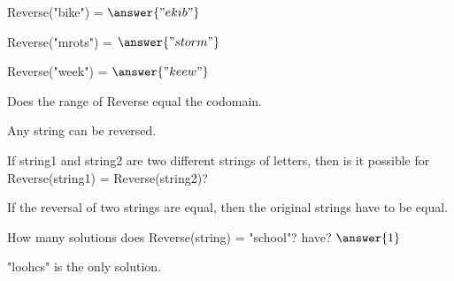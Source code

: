 \documentclass{ximera}
\begin{document}
\begin{exercise}


\begin{exercise}
Reverse("bike") = $\answer{"ekib"}$
\end{exercise}


\begin{exercise}
Reverse("mrots") = $\answer{"storm"}$
\end{exercise}


\begin{exercise}
Reverse("week") = $\answer{"keew"}$
\end{exercise}








\begin{exercise}

Does the range of Reverse equal the codomain.

  \begin{multipleChoice}
  \end{multipleChoice}
  \begin{feedback}
Any string can be reversed.
  \end{feedback}
\end{exercise}




\begin{exercise}

If string1 and string2 are two different strings of letters, then is it possible for Reverse(string1) = Reverse(string2)?

  \begin{multipleChoice}
  \end{multipleChoice}
  \begin{feedback}
If the reversal of two strings are equal, then the original strings have to be equal.
  \end{feedback}
\end{exercise}








\begin{exercise}

How many solutions does Reverse(string) = "school"? have? $\answer{1}$


  \begin{feedback}
"loohcs" is the only solution.
  \end{feedback}
\end{exercise}









\end{exercise}
\end{document}
